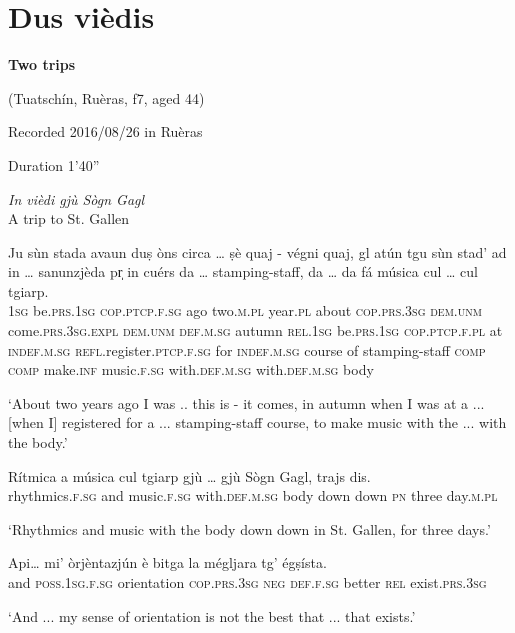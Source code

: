 \clearpage


\section{Dus vièdis}\label{sec:8.14}

\noindent
\textbf{Two trips}

\noindent
(Tuatschín, Ruèras, f7, aged 44)

\noindent
Recorded 2016/08/26 in Ruèras

\noindent
Duration 1'40''

\bigskip

\textit{In vièdi gjù Sògn Gagl}\\
A trip to St. Gallen\\
\smallskip


\begin{linenumbers}
	\gll Ju sùn stada avaun duṣ òns circa … ṣè quaj - végni quaj, gl atún tgu sùn stad' ad in …  sanunzjèda pr̩ in cuérs da … stamping-staff, da … da fá música cul … cul tgiarp.\\
	\textsc{1sg} be.\textsc{prs.1sg} \textsc{cop.ptcp.f.sg} ago two.\textsc{m.pl} year.\textsc{pl} about {} \textsc{cop.prs.3sg} \textsc{dem.unm} {} come.\textsc{prs.3sg.expl} \textsc{dem.unm} \textsc{def.m.sg} autumn \textsc{rel.1sg} be.\textsc{prs.1sg} \textsc{cop.ptcp.f.pl} at \textsc{indef.m.sg} {} \textsc{refl}.register.\textsc{ptcp.f.sg} for \textsc{indef.m.sg} course of {} stamping-staff \textsc{comp} {} \textsc{comp} make.\textsc{inf} music.\textsc{f.sg} with.\textsc{def.m.sg} {} with.\textsc{def.m.sg} body  \\
\end{linenumbers}
\medskip
\glt `About two years ago I was .. this is - it comes, in autumn when I was at a ... [when I] registered for a ... stamping-staff course, to make music with the ... with the body.'
\medskip

\begin{linenumbers}
	\gll  Rítmica a música cul tgiarp gjù … gjù Sògn Gagl, trajs dis.  \\
	rhythmics.\textsc{f.sg} and music.\textsc{f.sg} with.\textsc{def.m.sg} body down down \textsc{pn} {} three day.\textsc{m.pl}\\
\end{linenumbers}
\medskip
\glt `Rhythmics and music with the body down {} down in St. Gallen, for three days.'
\medskip

\begin{linenumbers}
	\gll Api… mi’ òrjèntazjún è bitga la mégljara tg’ égṣísta.   \\
	and \textsc{poss.1sg.f.sg} orientation \textsc{cop.prs.3sg} \textsc{neg} \textsc{def.f.sg} better \textsc{rel} exist.\textsc{prs.3sg}\\
\end{linenumbers}
\medskip
\glt `And ... my sense of orientation is not the best that ... that exists.'
\medskip

